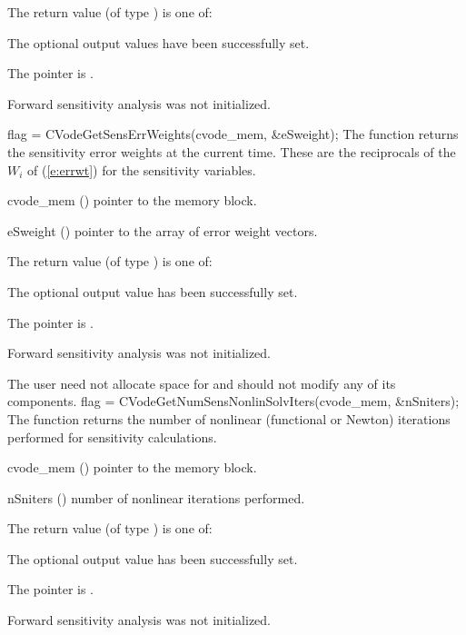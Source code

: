 {
  The return value  (of type ) is one of:
  \begin{args}
  \item[\Id{CV\_SUCCESS}] 
    The optional output values have been successfully set.
  \item[\Id{CV\_MEM\_NULL}]
    The  pointer is .
  \item[\Id{CV\_NO\_SENS}]
    Forward sensitivity analysis was not initialized.
  \end{args}
}
{}
{
  flag = CVodeGetSensErrWeights(cvode\_mem, \&eSweight);
}
{
  The function  returns the sensitivity error weights at the
  current time. These are the reciprocals of the $W_i$ of (\ref{e:errwt}) for the
  sensitivity variables.
}
{
  \begin{args}
  \item[cvode\_mem] ()
    pointer to the {\cvodes} memory block.
  \item[eSweight] ()
    pointer to the array of error weight vectors.
  \end{args}
}
{
  The return value  (of type ) is one of:
  \begin{args}
  \item[\Id{CV\_SUCCESS}] 
    The optional output value has been successfully set.
  \item[\Id{CV\_MEM\_NULL}]
    The  pointer is .
  \item[\Id{CV\_NO\_SENS}]
    Forward sensitivity analysis was not initialized.
  \end{args}
}
{
  The user need not allocate space for  and should not modify
  any of its components.
}
{
  flag = CVodeGetNumSensNonlinSolvIters(cvode\_mem, \&nSniters);
}
{
  The function  returns the
  number of nonlinear (functional or Newton) iterations performed for 
  sensitivity calculations.
}
{
  \begin{args}
  \item[cvode\_mem] ()
    pointer to the {\cvodes} memory block.
  \item[nSniters] ()
    number of nonlinear iterations performed.
  \end{args}
}
{
  The return value  (of type ) is one of:
  \begin{args}
  \item[\Id{CV\_SUCCESS}] 
    The optional output value has been successfully set.
  \item[\Id{CV\_MEM\_NULL}]
    The  pointer is .
  \item[\Id{CV\_NO\_SENS}]
    Forward sensitivity analysis was not initialized.
  \end{args}
}
